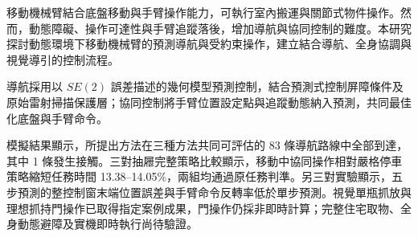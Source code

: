 \begin{abstractzh}
\setcounter{page}{1}

移動機械臂結合底盤移動與手臂操作能力，可執行室內搬運與關節式物件操作。然而，動態障礙、操作可達性與手臂追蹤落後，增加導航與協同控制的難度。本研究探討動態環境下移動機械臂的預測導航與受約束操作，建立結合導航、全身協調與視覺導引的控制流程。

導航採用以 \(SE(2)\) 誤差描述的幾何模型預測控制，結合預測式控制屏障條件及原始雷射掃描保護層；協同控制將手臂位置設定點與追蹤動態納入預測，共同最佳化底盤與手臂命令。

模擬結果顯示，所提出方法在三種方法共同可評估的 83 條導航路線中全部到達，其中 1 條發生接觸。三對抽屜完整策略比較顯示，移動中協同操作相對嚴格停車策略縮短任務時間 13.38--14.05\%，兩組均通過原任務判準。另三對實驗顯示，五步預測的整控制窗末端位置誤差與手臂命令反轉率低於單步預測。視覺單瓶抓放與理想抓持門操作已取得指定案例成果，門操作仍採非即時計算；完整住宅取物、全身動態避障及實機即時執行尚待驗證。

\end{abstractzh}

